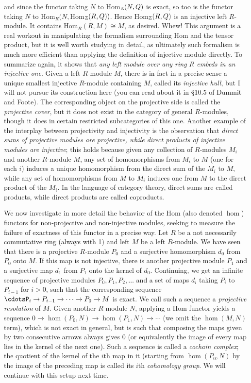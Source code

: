 and since the functor taking $N$ to Hom$_{\Bbb Z}(N,Q)$ is exact, so too is the functor taking
$N$ to Hom$_R(N,$Hom$_{\Bbb Z}(R,Q))$.  Hence Hom$_{\Bbb Z}(R,Q)$ is an injective left
$R$-module.  It contains Hom$_R(R,M)\cong M$, as desired.  Whew!  This argument is a real workout in manipulating the formalism surrounding Hom and the tensor product, but it is well worth studying in detail, as ultimately such formalism is much more efficient than applying the definition of injective module directly.  To summarize again, it shows that {\sl any left module over any ring $R$ embeds in an injective one}.  Given a left $R$-module $M$, there is in fact in a precise sense a unique smallest injective $R$-module containing $M$, called its {\sl injective hull}, but I will not pursue its construction here (you can read about it in \S10.5 of Dummit and Foote).  The corresponding object on the projective side is called the {\sl projective cover}, but it does not exist in the category of general $R$-modules, though it does in certain restricted subcategories of this one.  Another example of the interplay between projectivity and injectivity is the observation that {\sl direct sums of projective modules are projective, while direct products of injective modules are injective}; this holds because given any collection of $R$-modules $M_i$ and another $R$-module $M$, any set of homomorphisms from $M_i$ to $M$ (one for each $i$) induces a unique homomorphism from the direct sum of the $M_i$ to $M$, while any set of homomorphisms from $M$ to $M_i$ induces one from $M$ to the direct product of the $M_i$.  In the language of category theory, direct sums are called products, while direct products are called coproducts.

We now investigate in more detail the behavior of the Hom (also denoted $\hom$) functors for non-projective and non-injective modules, seeking to measure the failure of exactness of this functor in a precise way.  Let $R$ be a not necessarily commutative ring (always with 1) and left $M$ be a left $R$-module.  We have seen that there is a projective $R$-module $P_0$ and a surjective homomorphism $d_0$ from $P_0$ onto $M$.  If this map is not injective, there is another projective module $P_1$ and a surjective map $d_1$ from $P_1$ onto the kernel of $d_0$.  Continuing, we get an infinite sequence of projective modules $P_0,P_1,P_2,\ldots$ and a set of maps $d_i$ taking $P_i$ to $P_{i-1}$ for $i>0$, such that the corresponding sequence
$\cdotsP_i\rightarrow P_{i-1}\rightarrow\cdots\rightarrow P_0\rightarrow M$ is exact.  We call such a 
sequence a {\sl projective resolution} of $M$.  Given another $R$-module $N$, applying a Hom
functor yields a sequence
$0\rightarrow\hom(P_0,N)\rightarrow\hom(P_1,N)\rightarrow\cdots$ (we omit the $\hom(M,N)$ term), which is not exact in general, but is such that composing the maps given by two consecutive arrows always gives 0 (or equivalently the image of every map lies in the kernel of the next one).  Such a sequence is called a {\sl cochain complex}; the quotient of the kernel of the $i$th map in it (starting from $\hom(P_0,N)$ by the image of the preceding map is called its $i$th {\sl cohomology group}.
We will continue with this setup next time.